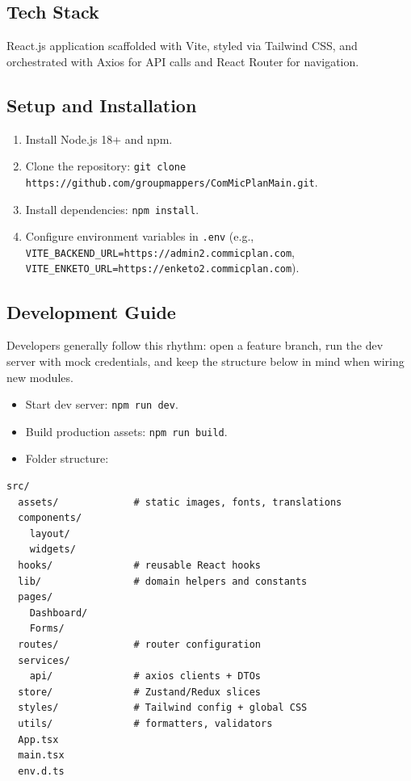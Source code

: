 \documentclass[11pt]{article}
\begin{document}
\subsection{Tech Stack}
React.js application scaffolded with Vite, styled via Tailwind CSS, and orchestrated with Axios for API calls and React Router for navigation.

\subsection{Setup and Installation}
\begin{enumerate}[leftmargin=*]
  \item Install Node.js 18+ and npm.
  \item Clone the repository: \verb|git clone https://github.com/groupmappers/ComMicPlanMain.git|.
  \item Install dependencies: \verb|npm install|.
  \item Configure environment variables in \verb|.env| (e.g., \verb|VITE_BACKEND_URL=https://admin2.commicplan.com|, \verb|VITE_ENKETO_URL=https://enketo2.commicplan.com|).
\end{enumerate}

\subsection{Development Guide}
\noindent Developers generally follow this rhythm: open a feature branch, run the dev server with mock credentials, and keep the structure below in mind when wiring new modules.
\begin{itemize}[leftmargin=*]
  \item Start dev server: \verb|npm run dev|.
  \item Build production assets: \verb|npm run build|.
  \item Folder structure:
\end{itemize}

\begin{lstlisting}
src/
  assets/             # static images, fonts, translations
  components/
    layout/
    widgets/
  hooks/              # reusable React hooks
  lib/                # domain helpers and constants
  pages/
    Dashboard/
    Forms/
  routes/             # router configuration
  services/
    api/              # axios clients + DTOs
  store/              # Zustand/Redux slices
  styles/             # Tailwind config + global CSS
  utils/              # formatters, validators
  App.tsx
  main.tsx
  env.d.ts
\end{lstlisting}
\end{document}
